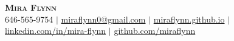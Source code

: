 \documentclass[a4paper,10pt]{article}
\begin{document}


\begin{center}
    \textbf{\Huge \scshape Mira Flynn} \\ \vspace{0pt}
    \small 646-565-9754 $|$
    \href{mailto:miraflynn0@gmail.com}{miraflynn0@gmail.com} $|$
    \href{https://miraflynn.github.io/}{miraflynn.github.io} $|$
    \href{https://www.linkedin.com/in/mira-flynn/}{linkedin.com/in/mira-flynn} $|$
    \href{https://github.com/miraflynn}{github.com/miraflynn}
\end{center}
\vspace{-16pt}
\end{document}
